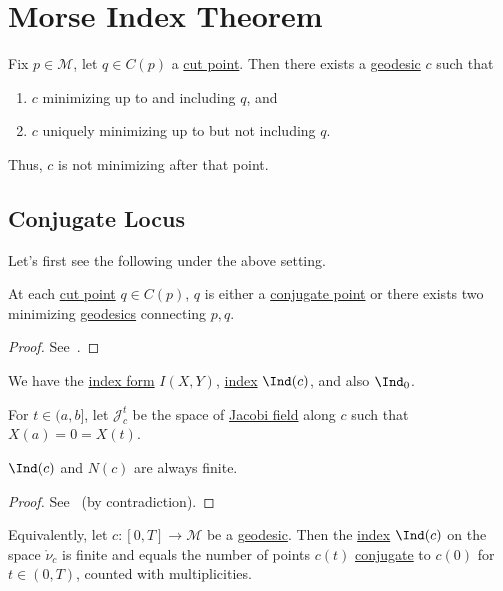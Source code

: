 \section{Morse Index Theorem}
\begin{prev}
	Fix \(p\in \mathcal{M} \), let \(q\in C(p)\) a \hyperref[def:cut-point]{cut point}. Then there exists a \hyperref[def:geodesic]{geodesic} \(c\) such that
	\begin{enumerate}
		\item \(c\) minimizing up to and including \(q\), and
		\item \(c\) uniquely minimizing up to but not including \(q\).
	\end{enumerate}
	Thus, \(c\) is not minimizing after that point.
\end{prev}

\subsection{Conjugate Locus}
Let's first see the following under the above setting.

\begin{proposition}\label{prop:lec21}
	At each \hyperref[def:cut-point]{cut point} \(q\in C(p)\), \(q\) is either a \hyperref[def:conjugate-point]{conjugate point} or there exists two minimizing \hyperref[def:geodesic]{geodesics} connecting \(p, q\).
\end{proposition}
\begin{proof}
	See~\cite{flaherty2013riemannian}.
\end{proof}

\begin{prev}
	We have the \hyperref[def:index-form]{index form} \(I(X, Y)\), \hyperref[def:index]{index} \(\Ind(c)\), and also \(\Ind_0 \).
\end{prev}

For \(t\in (a, b]\), let \(\mathcal{J} _c^t\) be the space of \hyperref[def:Jacobi-field]{Jacobi field} along \(c\) such that \(X(a) = 0 = X(t)\).

\begin{lemma}\label{lma:finite-index-nullity}
	\(\Ind(c)\) and \(N(c)\) are always finite.
\end{lemma}
\begin{proof}
	See~\cite{flaherty2013riemannian} (by contradiction).
\end{proof}

\begin{remark}[Reformulation]
	Equivalently, let \(c\colon [0, T] \to \mathcal{M} \) be a \hyperref[def:geodesic]{geodesic}. Then the \hyperref[def:index]{index} \(\Ind(c)\) on the space \(\mathring{\nu }_c\) is finite and equals the number of points \(c(t)\) \hyperref[def:conjugate-point]{conjugate} to \(c(0)\) for \(t\in (0, T)\), counted with multiplicities.
\end{remark}

